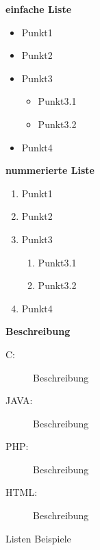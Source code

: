 \begin{figure}[H]
\begin{multicols}{3}
\textbf{einfache Liste}
\begin{itemize}
	\item Punkt1
	\item Punkt2
	\item  Punkt3
		\begin{itemize}
		\item Punkt3.1
	  	\item Punkt3.2
		\end{itemize}
	\item Punkt4
\end{itemize}
\columnbreak
\textbf{nummerierte Liste}
\begin{enumerate}
	\item Punkt1
	\item Punkt2
	\item  Punkt3
		\begin{enumerate}
		\item Punkt3.1
	  	\item Punkt3.2
		\end{enumerate}
	\item Punkt4
\end{enumerate}
\columnbreak
\textbf{Beschreibung}
\begin{description}
	\item [C:]		Beschreibung
	\item [JAVA:]	Beschreibung
	\item [PHP:]	Beschreibung
	\item [HTML:]	Beschreibung
\end{description}
\end{multicols}
\caption{Listen Beispiele}
\end{figure}